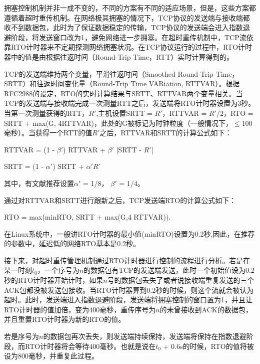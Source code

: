 拥塞控制机制并非一成不变的，不同的方案有不同的适应场景，但是，这些方案都遵循着超时重传机制。在网络极其拥塞的情况下，TCP协议的发送端与接收端都收不到数据包，此时为了保证数据稳定的传输，TCP协议的发送端会进入指数退避阶段，将发送窗口改为1，避免网络进一步拥塞。在超时重传机制中，TCP流依靠RTO计时器来不定期探测网络拥塞状况。在TCP协议运行的过程中，RTO计时器中的值是由根据往返时间（Round-Trip Time，RTT）实时计算得到的。

TCP的发送端维持两个变量，平滑往返时间（Smoothed Round-Trip Time，SRTT）和往返时间变化量（Round-Trip Time VARiation, RTTVAR）。根据RFC2988\cite{2000Computing}的设定，RTO的实时计算结果与SRTT、RTTVAR两个变量相关。当TCP的发送端与接收端完成一次测量RTT之后，发送端将RTO计时器设置为3秒。
当第一次测量获得的RTT，$R'$,主机设置SRTT = $R'$，RTTVAR = $R' / 2$，RTO = SRTT + max(G, 4RTTVAR)，此处的G被标记为时钟粒度（一般情况下，$\leq$100毫秒）。当获得一个RTT的值$R'$之后，RTTVAR和SRTT的计算公式如下：


\begin{center}
    RTTVAR = (1 - $\beta '$) RTTVAR + $\beta '$ |SRTT - $R'$|
\vspace{-0.1in}
\end{center}

\begin{center}
    SRTT = (1 - $\alpha '$) SRTT + $\alpha ' R'$
\end{center}

其中，有文献\cite{Jacobson1988Congestion}推荐设置$\alpha '$ = 1/8， $\beta '$ = 1/4。


通过对RTTVAR和SRTT进行跟新之后，TCP发送端RTO的计算公式如下：
\begin{center}
    RTO = max(minRTO, SRTT + max(G,4 RTTVAR)).
\end{center}

在Linux系统中，一般讲RTO计时器的最小值(minRTO)设置为0.2秒,因此，在推荐的参数中，延迟低的网络RTO基本是0.2秒。

接下来，对超时重传管理机制通过RTO计时器进行控制的流程进行分析。若是在某一时刻$t_0$，一个序号为$n$的数据包有TCP的发送端发送，此时一个初始值设为0.2秒的RTO计时器开始计时，如果$n$号的数据包丢失了或者说接收端重复发送的三个ACK包都没被发送包接收。当RTO计时器算到0.2秒的时候，则这个流就会被认为超时。此时，发送端进入指数退避阶段，发送端将拥塞控制的窗口置为1，并且让RTO计时器的值加倍，变为400毫秒，重传序号为$n$的未曾接收到ACK的数据包，并且重置RTO计时器为新的RTO的值。

若是序号为$n$的数据包再次丢失，则发送端持续保持，发送端将保持在指数退避阶段，而RTO计时器将会等待400毫秒。也就是说在$t_0$ + 0.6s的时候，RTO的值将被设为800毫秒，并重复此过程。


